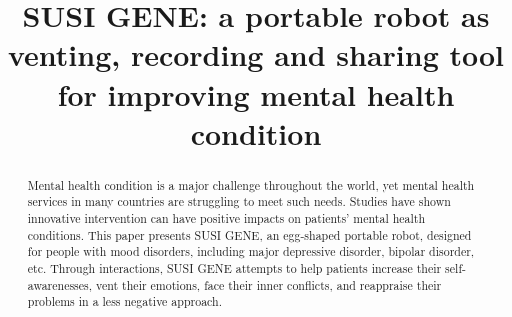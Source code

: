 \documentclass[manuscript,screen]{acmart}
\begin{document}
\title{SUSI GENE: a portable robot as venting, recording  and sharing tool for improving mental health condition}










\renewcommand{\shortauthors}{Zhang and Tong, et al.}

\begin{abstract}

  Mental health condition is a major challenge throughout the world, yet mental health services in many countries are struggling to meet such needs. Studies have shown innovative intervention can have positive impacts on patients' mental health conditions. This paper presents SUSI GENE, an egg-shaped portable robot, designed for people with mood disorders, including major depressive disorder, bipolar disorder, etc. Through interactions, SUSI GENE attempts to help patients increase their self-awarenesses, vent their emotions, face their inner conflicts, and reappraise their problems in a less negative approach.

\end{abstract}
\end{document}
